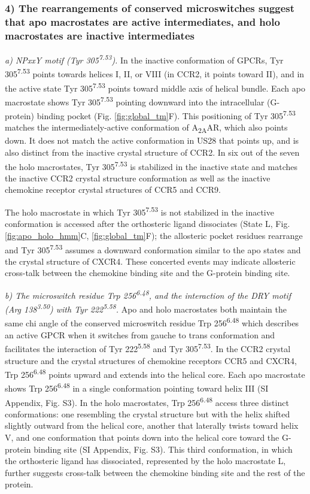 \documentclass[9pt,twocolumn,twoside]{pnas-new}
\begin{document}
\subsubsection*{4) The rearrangements of conserved microswitches suggest that apo macrostates are active intermediates, and holo macrostates are inactive intermediates}
\emph{a) NPxxY motif (Tyr 305\textsuperscript{7.53}).}
In the inactive conformation of GPCRs, Tyr 305\textsuperscript{7.53} points towards helices I, II, or VIII (in CCR2, it points toward II), and in the active state Tyr 305\textsuperscript{7.53} points toward middle axis of helical bundle\cite{Katritch2013}.
Each apo macrostate shows Tyr 305\textsuperscript{7.53} pointing downward into the intracellular (G-protein) binding pocket (Fig. \ref{fig:global_tm}F).
This positioning of Tyr 305\textsuperscript{7.53} matches the intermediately-active conformation of A\textsubscript{2A}AR, which also points down. It does not match the active conformation in US28 that points up, and is also distinct from the inactive crystal structure of CCR2.
In six out of the seven the holo macrostates, Tyr 305\textsuperscript{7.53} is stabilized in the inactive state and matches the inactive CCR2 crystal structure conformation as well as the inactive chemokine receptor crystal structures of CCR5 and CCR9.

The holo macrostate in which Tyr 305\textsuperscript{7.53} is not stabilized in the inactive conformation is accessed after the orthosteric ligand dissociates (State L, Fig. \ref{fig:apo_holo_hmm}C, \ref{fig:global_tm}F); the allosteric pocket residues rearrange and Tyr 305\textsuperscript{7.53} assumes a downward conformation similar to the apo states and the crystal structure of CXCR4.
These concerted events may indicate allosteric cross-talk between the chemokine binding site and the G-protein binding site.

\emph{b) The microswitch residue Trp 256\textsuperscript{6.48}, and the interaction of the DRY motif (Arg 138\textsuperscript{3.50}) with Tyr 222\textsuperscript{5.58}.}
Apo and holo macrostates both maintain the same chi angle of the conserved microswitch residue Trp 256\textsuperscript{6.48} which describes an active GPCR when it switches from gauche to trans conformation and facilitates the interaction of Tyr 222\textsuperscript{5.58} and Tyr 305\textsuperscript{7.53}.
In the CCR2 crystal structure and the crystal structures of chemokine receptors CCR5 and CXCR4, Trp 256\textsuperscript{6.48} points upward and extends into the helical core.
Each apo macrostate shows Trp 256\textsuperscript{6.48} in a single conformation pointing toward helix III (SI Appendix, Fig. S3).
In the holo macrostates, Trp 256\textsuperscript{6.48} access three distinct conformations: one resembling the crystal structure but with the helix shifted slightly outward from the helical core, another that laterally twists toward helix V, and one conformation that points down into the helical core toward the G-protein binding site (SI Appendix, Fig. S3).
This third conformation, in which the orthosteric ligand has dissociated, represented by the holo macrostate L, further suggests cross-talk between the chemokine binding site and the rest of the protein.
\end{document}
